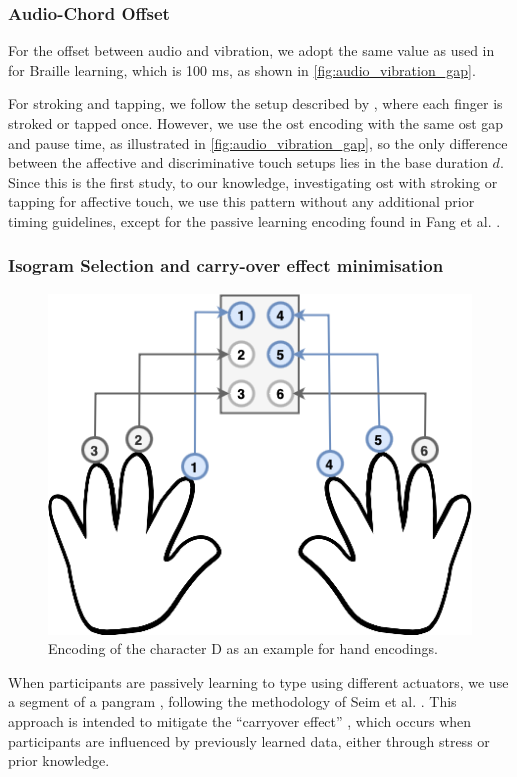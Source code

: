 \subsubsection{Audio-Chord Offset}
For the offset between audio and vibration, we adopt the same value as used in \cite{Seim2017} for Braille learning, which is 100 ms, as shown in \autoref{fig:audio_vibration_gap}.

For stroking and tapping, we follow the setup described by \cite{Fang2023}, where each finger is stroked or tapped once. However, we use the \gls{ost} encoding with the same \gls{ost} gap and pause time, as illustrated in \autoref{fig:audio_vibration_gap}, so the only difference between the affective and discriminative touch setups lies in the base duration $d$. Since this is the first study, to our knowledge, investigating \gls{ost} with stroking or tapping for affective touch, we use this pattern without any additional prior timing guidelines, except for the passive learning encoding found in Fang et al. \cite{Fang2023}.


\subsubsection{Isogram Selection and carry-over effect minimisation}
\begin{figure}
    \centering
    \includegraphics[width=0.5\linewidth]{src/pictures/handBrailleEncoding.drawio.png}
    \caption{Encoding of the character D as an example for hand encodings.}
    \label{fig:hand-encoding}
\end{figure}


When participants are passively learning to type using different actuators, we use a segment of a pangram \cite{Brooke1987}, following the methodology of Seim et al. \cite{Seim2018, Seim2016}. This approach is intended to mitigate the \enquote{carryover effect} \cite{MacFie1989, Brooks2012}, which occurs when participants are influenced by previously learned data, either through stress or prior knowledge.

